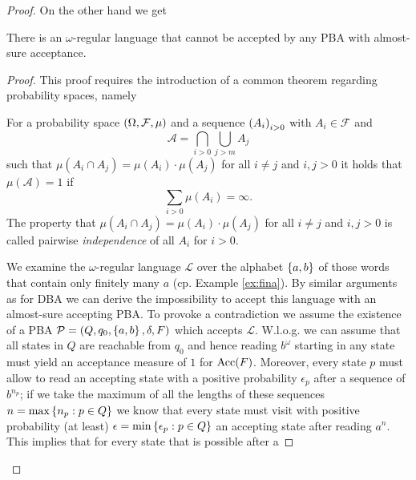 \begin{proof}
  On the other hand we get
  \begin{lemma}
    \cite[Theorem 4.4.9 (b)]{Groesser}
    There is an $\omega$-regular language that cannot be accepted by any 
    \ac{PBA} with almost-sure acceptance.
    \label{lem:omegaregnotpba}
  \end{lemma}
  \begin{proof}
    This proof requires the introduction of a common theorem regarding 
    probability spaces, namely
    \begin{theorem}
      \cite[Theorem 2.7]{Klenke}
      For a probability space $\left(\Omega, \mathcal{F}, \mu\right)$ and a sequence 
      $\left(A_{i}\right)_{i>0}$ with $A_{i}\in\mathcal{F}$ and
      \begin{equation*}
        \mathcal{A} = \bigcap_{i > 0}\bigcup_{j > m}A_{j}
      \end{equation*}
      such that $\mu(A_{i}\cap A_{j}) = \mu(A_{i})\cdot\mu(A_{j})$ for all 
      $i \neq j$ and $i,j > 0$ it holds that $\mu(\mathcal{A}) = 1$ if
      \begin{equation*}
        \sum\limits_{i>0}\mu(A_{i}) = \infty.
      \end{equation*}
      The property that $\mu(A_{i}\cap A_{j}) = \mu(A_{i})\cdot\mu(A_{j})$ for 
      all $i \neq j$ and $i,j > 0$ is called pairwise \emph{independence} of 
      all $A_{i}$ for $i > 0$.
      \label{thm:BorelCantelli}
    \end{theorem}
    We examine the $\omega$-regular language $\mathcal{L}$ over the alphabet
    $\left\{a,b\right\}$ of those words that contain only finitely many $a$ (cp. Example
    \ref{ex:fina}). By similar arguments as for \ac{DBA} we can derive the
    impossibility to accept this language with an almost-sure accepting 
    \ac{PBA}. To provoke a contradiction we assume the existence of a \ac{PBA}
    $\mathcal{P} = \left(Q, q_{0}, \left\{a,b\right\}, \delta, F\right)$ which accepts 
    $\mathcal{L}$. W.l.o.g. we can assume that all states in $Q$ are reachable
    from $q_{0}$ and hence reading $b^{\omega}$ starting in any state must 
    yield an acceptance measure of $1$ for $\operatorname{Acc}(F)$. Moreover, every state $p$ 
    must allow to read an accepting state with a positive probability 
    $\epsilon_{p}$ after a sequence of $b^{n_{p}}$; if we take the maximum of 
    all the lengths of these sequences $n = \max\left\{n_{p}:p\in Q\right\}$ we know 
    that every state must visit with positive probability (at least) 
    $\epsilon = \min\left\{\epsilon_{p}:p\in Q\right\}$ an accepting state after reading 
    $a^{n}$. This implies that for every state that is possible after a 

\end{proof}
\end{proof}
